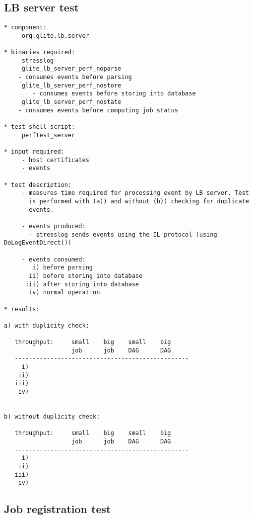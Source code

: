 \subsection{LB server test}


\begin{verbatim}
* component:
     org.glite.lb.server

* binaries required:
     stresslog
     glite_lb_server_perf_noparse
	- consumes events before parsing
     glite_lb_server_perf_nostore
        - consumes events before storing into database
     glite_lb_server_perf_nostate
	- consumes events before computing job status

* test shell script:
     perftest_server

* input required:
     - host certificates
     - events

* test description:
     - measures time required for processing event by LB server. Test
       is performed with (a)) and without (b)) checking for duplicate
       events.

     - events produced:
	   - stresslog sends events using the IL protocol (using DoLogEventDirect())

     - events consumed:
	    i) before parsing
	   ii) before storing into database
	  iii) after storing into database
	   iv) normal operation

* results:

a) with duplicity check:

   throughput:     small    big    small    big
                   job      job    DAG      DAG
   -------------------------------------------------
     i)
    ii)
   iii)
    iv)


b) without duplicity check:

   throughput:     small    big    small    big
                   job      job    DAG      DAG
   -------------------------------------------------
     i)
    ii)
   iii)
    iv)

\end{verbatim}

\subsection{Job registration test}

